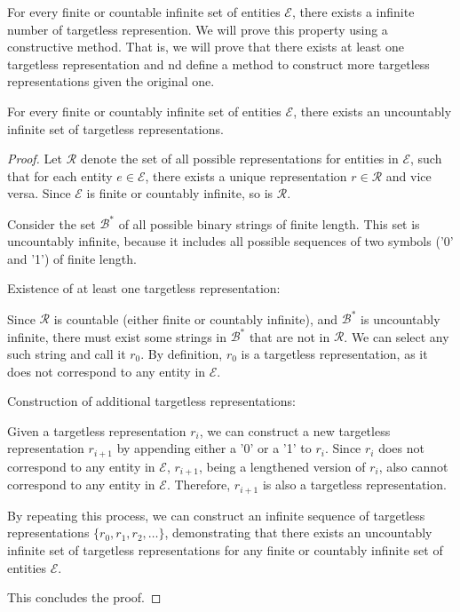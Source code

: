 For every finite or countable infinite set of entities $\mathcal{E}$, there exists a infinite number of targetless represention. We will prove this property using a constructive method. That is, we will prove that there exists at least one targetless representation and nd define a method to construct more targetless representations given the original one.

\begin{proposition}
For every finite or countably infinite set of entities $\mathcal{E}$, there exists an uncountably infinite set of targetless representations.
\end{proposition}
\begin{proof}
Let $\mathcal{R}$ denote the set of all possible representations for entities in $\mathcal{E}$, such that for each entity $e \in \mathcal{E}$, there exists a unique representation $r \in \mathcal{R}$ and vice versa. Since $\mathcal{E}$ is finite or countably infinite, so is $\mathcal{R}$.

Consider the set $\mathcal{B}^\ast$ of all possible binary strings of finite length. This set is uncountably infinite, because it includes all possible sequences of two symbols ('0' and '1') of finite length.

Existence of at least one targetless representation:

Since $\mathcal{R}$ is countable (either finite or countably infinite), and $\mathcal{B}^\ast$ is uncountably infinite, there must exist some strings in $\mathcal{B}^\ast$ that are not in $\mathcal{R}$. We can select any such string and call it $r_0$. By definition, $r_0$ is a targetless representation, as it does not correspond to any entity in $\mathcal{E}$.

Construction of additional targetless representations:

Given a targetless representation $r_i$, we can construct a new targetless representation $r_{i+1}$ by appending either a '0' or a '1' to $r_i$. Since $r_i$ does not correspond to any entity in $\mathcal{E}$, $r_{i+1}$, being a lengthened version of $r_i$, also cannot correspond to any entity in $\mathcal{E}$. Therefore, $r_{i+1}$ is also a targetless representation.

By repeating this process, we can construct an infinite sequence of targetless representations $\{r_0, r_1, r_2, \ldots\}$, demonstrating that there exists an uncountably infinite set of targetless representations for any finite or countably infinite set of entities $\mathcal{E}$. 

This concludes the proof.
\end{proof}


